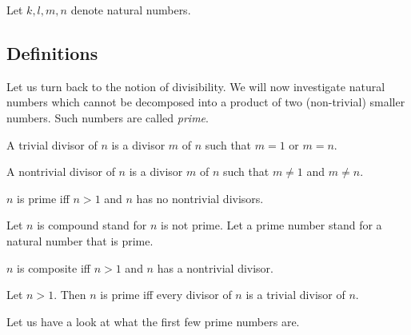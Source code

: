 \documentclass[../../arithmetic.ftl.tex]{subfiles}
\begin{document}
  \begin{forthel}
  \end{forthel}

  \begin{forthel}
    Let $k, l, m, n$ denote natural numbers.
  \end{forthel}


  \subsection{Definitions}

  Let us turn back to the notion of divisibility. We will now investigate
  natural numbers which cannot be decomposed into a product of two
  (non-trivial) smaller numbers. Such numbers are called \textit{prime}.

  \begin{forthel}
    \begin{definition}
      A trivial divisor of $n$ is a divisor $m$ of $n$ such that $m = 1$ or $m = n$.
    \end{definition}

    \begin{definition}
      A nontrivial divisor of $n$ is a divisor $m$ of $n$ such that $m \neq 1$ and $m \neq n$.
    \end{definition}

    \begin{definition}
      $n$ is prime iff $n > 1$ and $n$ has no nontrivial divisors.
    \end{definition}

    Let $n$ is compound stand for $n$ is not prime.
    Let a prime number stand for a natural number that is prime.

    \begin{definition}
      $n$ is composite iff $n > 1$ and $n$ has a nontrivial divisor.
    \end{definition}

    \begin{proposition}\label{Arithmetic_03_04_357744}
      Let $n > 1$.
      Then $n$ is prime iff every divisor of $n$ is a trivial divisor of $n$.
    \end{proposition}
  \end{forthel}

  Let us have a look at what the first few prime numbers are.
\end{document}
